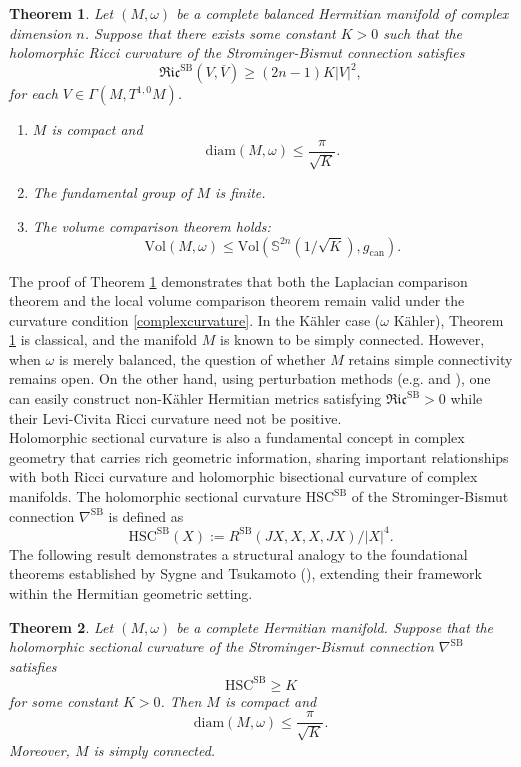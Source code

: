 \documentclass[12pt, reqno]{amsart}
\theoremstyle{plain}
\newtheorem{thm}{Theorem}[section]
\theoremstyle{definition}
\newcommand{\btheorem}{\begin{thm}}
\newcommand{\etheorem}{\end{thm}}
\renewcommand{\bar}{\overline}
\newcommand{\beq}{\begin{equation}}
\newcommand{\eeq}{\end{equation}}
\newcommand{\bd}{\begin{enumerate}}
\newcommand{\ed}{\end{enumerate}}
\renewcommand{\>}{\rightarrow}
\newcommand{\diam}{\mathrm{diam}}
\newcommand{\MS}{\mathrm{SB}}
\renewcommand{\>}{\rightarrow}
\numberwithin{equation}{section} %
\begin{document}
    \btheorem\label{Myers}  Let $(M,\omega)$ be a complete balanced Hermitian manifold of complex dimension $n$. Suppose that there exists some constant $K>0$ such that the holomorphic Ricci curvature of the Strominger-Bismut connection satisfies
 \beq \mathfrak{Ric}^{\MS} (V,\bar V)\geq (2n-1)K |V|^2, \label{complexcurvature} \eeq 
 for each $V\in\Gamma(M,T^{1,0}M)$. \bd \item $M$ is compact and 
   $$
   \diam(M, \omega)\leq \frac{\pi}{\sqrt{K}}.
   $$
   \item The fundamental group of $M$ is finite.
  \item The volume comparison theorem holds:
 \beq  \mathrm{Vol}(M,\omega)\leq \mathrm{Vol}\left(\mathbb S^{2n}\left(1/\sqrt{K}\right), g_{\mathrm{can}}\right).\eeq 
   \ed 
   \etheorem
\noindent The proof of Theorem \ref{Myers} demonstrates that both the Laplacian comparison theorem and the local volume comparison theorem remain valid under the curvature condition \eqref{complexcurvature}. In the K\"ahler case ($\omega$ K\"ahler), Theorem \ref{Myers} is classical, and the manifold $M$ is known to be simply connected. However, when 
$\omega$ is merely balanced, the question of whether $M$ retains simple connectivity remains open. On the other hand,   using perturbation methods  (e.g. \cite{LY16} and \cite{WY25}), one can easily construct  non-K\"ahler Hermitian  metrics satisfying $\mathfrak{Ric}^{\MS}>0$ while their Levi-Civita Ricci curvature need not be positive.‌\\



   Holomorphic sectional curvature is also a fundamental concept in complex geometry that  carries rich geometric information, sharing important relationships with both Ricci curvature and holomorphic bisectional curvature   of complex manifolds. The holomorphic sectional curvature $\mathrm{HSC}^{\MS}$ of the Strominger-Bismut connection $\nabla^\MS$ is defined as
  \beq
  \mathrm{HSC}^{\MS}(X):=R^{\MS}(JX,X,X,JX)/|X|^4. \eeq
 The following result demonstrates a structural analogy to the foundational theorems established by Sygne and Tsukamoto (\cite{Tsu57}), extending their framework within the Hermitian geometric setting.
   \begin{thm}\label{thm-compactness from HSC}
    Let $(M,\omega)$ be a complete Hermitian manifold. Suppose that the holomorphic sectional curvature  of the Strominger-Bismut connection $\nabla^\MS$ satisfies $$  \mathrm{HSC}^{\MS}\geq K$$  for some constant  $K>0$.  Then  $M$ is compact and
    $$
    \diam(M,\omega)\leq \frac{\pi}{\sqrt{K}}.
    $$
Moreover,  $M$ is simply connected.
   \end{thm}
\end{document}
